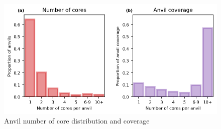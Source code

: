 \begin{figure}[tp]
    \centering
    \includegraphics[width=\textwidth]{figures/ch2_19.png}
    \caption{Anvil number of core distribution and coverage}
    \label{fig:anvil_cores_and_coverage}
\end{figure}

